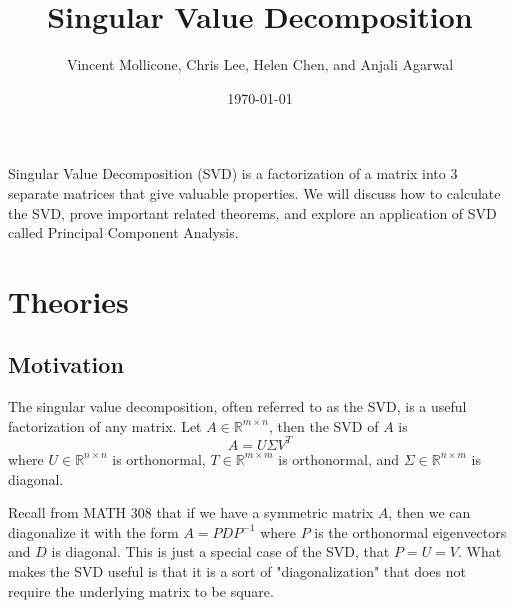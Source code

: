 \documentclass{article}
\title{Singular Value Decomposition}
\author{Vincent Mollicone, Chris Lee, Helen Chen, and Anjali Agarwal}
\date{\today}
\begin{document}
\maketitle
Singular Value Decomposition (SVD) is a factorization of a matrix into 3 separate matrices that give valuable properties. We will discuss how to calculate the SVD, prove important related theorems, and explore an application of SVD called Principal Component Analysis.
\tableofcontents
\newpage

\section{Theories}
\subsection{Motivation}
The singular value decomposition, often referred to as the SVD, is a useful factorization of any matrix. Let $A\in\mathbb{R}^{m\times n}$, then the SVD of $A$ is
$$A = U \Sigma V^T$$
where $U\in\mathbb{R}^{n\times n}$ is orthonormal, $T\in\mathbb{R}^{m\times m}$ is orthonormal, and $\Sigma\in\mathbb{R}^{n\times m}$ is diagonal.

Recall from MATH 308 that if we have a symmetric matrix $A$, then we can diagonalize it with the form $A=PDP^{-1}$ where $P$ is the orthonormal eigenvectors and $D$ is diagonal. This is just a special case of the SVD, that $P = U = V$. What makes the SVD useful is that it is a sort of "diagonalization" that does not require the underlying matrix to be square.
\end{document}
